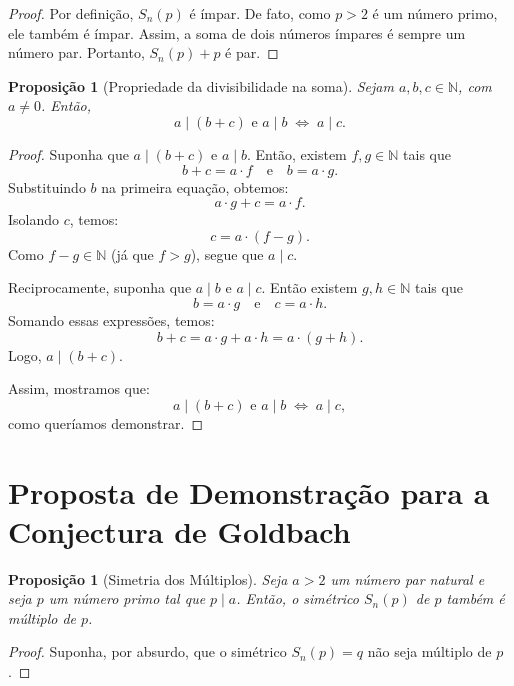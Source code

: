 \documentclass[a4paper,11pt]{article}
\newtheorem{proposition}[theorem]{Proposição}
\theoremstyle{definition}
\theoremstyle{remark}
\begin{document}
\begin{otherlanguage}{brazil}
	
	\begin{proof}
		Por definição, \( S_n(p) \) é ímpar. De fato, como \( p > 2 \) é um número primo, ele também é ímpar. Assim, a soma de dois números ímpares é sempre um número par. Portanto, \( S_n(p) + p \) é par. 
	\end{proof}
	
	\begin{proposition}[Propriedade da divisibilidade na soma]\label{prop:divisibilidade_na_soma}
		Sejam \( a, b, c \in \mathbb{N} \), com \( a \neq 0 \). Então,
		\[
		a \mid (b + c) \text{ e } a \mid b \;\Longleftrightarrow\; a \mid c.
		\]
	\end{proposition}
	
	\begin{proof}
		Suponha que \( a \mid (b + c) \) e \( a \mid b \). Então, existem \( f, g \in \mathbb{N} \) tais que
		\[
		b + c = a \cdot f \quad \text{e} \quad b = a \cdot g.
		\]
		Substituindo \( b \) na primeira equação, obtemos:
		\[
		a \cdot g + c = a \cdot f.
		\]
		Isolando \( c \), temos:
		\[
		c = a \cdot (f - g).
		\]
		Como \( f - g \in \mathbb{N} \) (já que \( f > g \)), segue que \( a \mid c \).
		
		Reciprocamente, suponha que \( a \mid b \) e \( a \mid c \). Então existem \( g, h \in \mathbb{N} \) tais que
		\[
		b = a \cdot g \quad \text{e} \quad c = a \cdot h.
		\]
		Somando essas expressões, temos:
		\[
		b + c = a \cdot g + a \cdot h = a \cdot (g + h).
		\]
		Logo, \( a \mid (b + c) \).
		
		Assim, mostramos que:
		\[
		a \mid (b + c) \text{ e } a \mid b \;\Longleftrightarrow\; a \mid c,
		\]
		como queríamos demonstrar.
	\end{proof}
	
	
	\section{Proposta de Demonstração para a Conjectura de Goldbach}
	\begin{proposition}[Simetria dos Múltiplos]\label{prop:simetria_dos_multiplos}
		Seja \(a > 2\) um número par natural e seja \(p\) um número primo tal que \(p \mid a\). Então, o simétrico \(S_n(p)\) de \(p\) também é múltiplo de \(p\).
	\end{proposition}
	
	\begin{proof}
		Suponha, por absurdo, que o simétrico \(S_n(p) = q\) não seja múltiplo de \(p\). 
		

\end{proof}
\end{otherlanguage}
\end{document}
